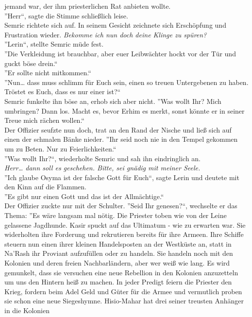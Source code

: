 jemand war, der ihm priesterlichen Rat anbieten wollte.\\
''Herr``, sagte die Stimme schließlich leise.\\
Semric richtete sich auf. In seinem Gesicht zeichnete sich Erschöpfung und Frustration wieder. 
\textit{Bekomme ich nun doch deine Klinge zu spüren?}\\
''Lerin``, stellte Semric müde fest.\\
''Die Verkleidung ist brauchbar, aber euer Leibwächter hockt vor der Tür und guckt böse drein.``\\
''Er sollte nicht mitkommen.``\\
''Nun… dass muss schlimm für Euch sein, einen so treuen Untergebenen zu haben. Tröstet es Euch, 
dass 
es nur einer ist?``\\
Semric funkelte ihn böse an, erhob sich aber nicht. ''Was wollt Ihr? Mich umbringen? Dann los. 
Macht 
es, bevor Erhim es merkt, sonst könnte er in seiner Treue mich rächen wollen.``\\
Der Offizier seufzte nun doch, trat an den Rand der Nische und ließ sich auf einen der schmalen 
Bänke nieder. ''Ihr seid noch nie in den Tempel gekommen um zu Beten. Nur zu Feierlichkeiten.``\\
''Was wollt Ihr?``, wiederholte Semric und sah ihn eindringlich an.\\
\textit{Herr… dann soll es geschehen. Bitte, sei gnädig mit meiner Seele.}\\
''Ich glaube Osyma ist der falsche Gott für Euch``, sagte Lerin und deutete mit den Kinn auf die 
Flammen.\\
''Es gibt nur einen Gott und das ist der Allmächtige.``\\
Der Offizier zuckte nur mit der Schulter. ''Seid Ihr genesen?``, wechselte er das Thema: ''Es wäre 
langsam mal nötig. Die Priester toben wie von der Leine gelassene Jagdhunde. Kasir spuckt auf das 
Ultimatum - wie zu erwarten war. Sie widerholten ihre Forderung und rekrutieren bereits für ihre 
Armeen. Ihre Schiffe steuern nun einen ihrer kleinen Handelsposten an der Westküste an, statt in 
Na'Rash ihr Proviant aufzufüllen oder zu handeln. Sie handeln noch mit den Kolonien und deren 
freien Nachbarländern, aber wer weiß wie lang. Es wird gemunkelt, dass sie versuchen eine neue 
Rebellion in den Kolonien anzuzetteln um uns den Hintern heiß zu machen. In jeder Predigt feiern 
die Priester den Krieg, fordern beim Adel Geld und Güter für die Armee und vermutlich proben sie 
schon eine neue Siegeshymne. Hisio-Mahar hat drei seiner treusten Anhänger in die Kolonien 
